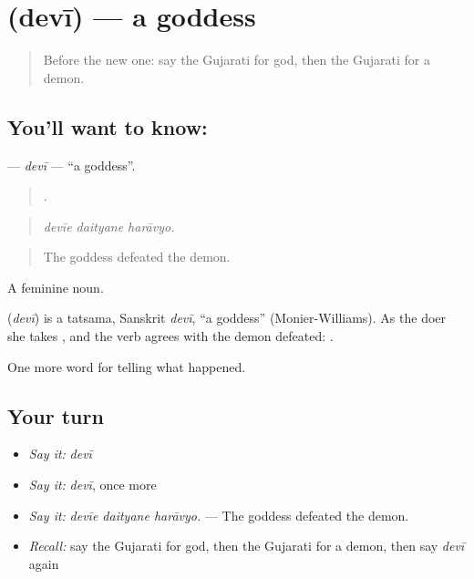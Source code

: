 \section[\texorpdfstring{\gu{દેવી} (devī)}{દેવી (devī)}]{ (devī) — a goddess}

\label{lesson:GU-C332-devi}



\begin{quote}
Before the new one: say the Gujarati for god, then the Gujarati for a demon.
\end{quote}

\subsection*{You'll want to know: }
\textbf{} — \emph{devī} — \textquotedblleft{}a goddess\textquotedblright{}.

\begin{quote}
  .
\end{quote}

\begin{quote}
\emph{devīe daityane harāvyo.}
\end{quote}

\begin{quote}
The goddess defeated the demon.
\end{quote}

A feminine noun.

\begin{cousinweb}
\textbf{} (\emph{devī}) is a tatsama, Sanskrit \emph{devī}, \textquotedblleft{}a goddess\textquotedblright{} (Monier-Williams). As the doer she takes \textbf{}, and the verb agrees with the demon defeated: \textbf{ }.
\end{cousinweb}

\begin{grammarlens}[title={What you've built}]
One more word for telling what happened.
\end{grammarlens}

\subsection*{Your turn}
\begin{itemize}
\raggedright
  \item \emph{Say it:} \emph{devī}
  \item \emph{Say it:} \emph{devī}, once more
  \item \emph{Say it:} \emph{devīe daityane harāvyo.} — The goddess defeated the demon.
  \item \emph{Recall:} say the Gujarati for god, then the Gujarati for a demon, then say \emph{devī} again
\end{itemize}

